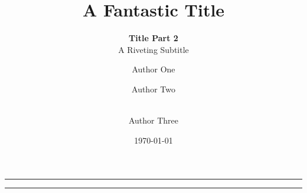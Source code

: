 \title{A Fantastic Title}
\subtitle{{\vspace{-1em}\huge \color{myDarkBlue}\textbf{Title Part
                2}}\\\vspace{1.5em}A Riveting Subtitle}

\author[1]{Author One}
\author[2]{Author Two}
\author[2, $\dagger$]{\\Author Three}


\newcommand{\compactAuthor}{My Group of Authors}

\date{\today}

\onecolumn

\maketitle

\thispagestyle{empty}
\vfill
\hrule

\begin{abstract}
    \lipsum[1]
\end{abstract}

\hrule
\vfill

\twocolumn

\setcounter{page}{1}
